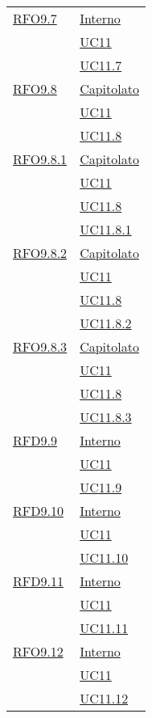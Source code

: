 \begin{longtable}{|>{\centering}m{5cm}|m{5cm}<{\centering}|}
    \hyperlink{RFO9.7}{RFO9.7} 
    & \hyperlink{Interno}{Interno}\\
  & \hyperref[UC11]{UC11}\\
  & \hyperref[UC11.7]{UC11.7}\\\hline

  \hyperlink{RFO9.8}{RFO9.8} 
  & \hyperlink{Capitolato}{Capitolato}\\
& \hyperref[UC11]{UC11}\\
& \hyperref[UC11.8]{UC11.8}\\\hline

\hyperlink{RFO9.8.1}{RFO9.8.1} 
  & \hyperlink{Capitolato}{Capitolato}\\
& \hyperref[UC11]{UC11}\\
& \hyperref[UC11.8]{UC11.8}\\
& \hyperref[UC11.8.1]{UC11.8.1}\\\hline

\hyperlink{RFO9.8.2}{RFO9.8.2} 
  & \hyperlink{Capitolato}{Capitolato}\\
& \hyperref[UC11]{UC11}\\
& \hyperref[UC11.8]{UC11.8}\\
& \hyperref[UC11.8.2]{UC11.8.2}\\\hline

\hyperlink{RFO9.8.3}{RFO9.8.3} 
  & \hyperlink{Capitolato}{Capitolato}\\
& \hyperref[UC11]{UC11}\\
& \hyperref[UC11.8]{UC11.8}\\
& \hyperref[UC11.8.3]{UC11.8.3}\\\hline

  \hyperlink{RFD9.9}{RFD9.9} 
  & \hyperlink{Interno}{Interno}\\
& \hyperref[UC11]{UC11}\\
& \hyperref[UC11.9]{UC11.9}\\\hline

 \hyperlink{RFD9.10}{RFD9.10} 
  & \hyperlink{Interno}{Interno}\\
& \hyperref[UC11]{UC11}\\
& \hyperref[UC11.10]{UC11.10}\\\hline

 \hyperlink{RFD9.11}{RFD9.11} 
  & \hyperlink{Interno}{Interno}\\
& \hyperref[UC11]{UC11}\\
& \hyperref[UC11.11]{UC11.11}\\\hline

  \hyperlink{RFO9.12}{RFO9.12} 
  & \hyperlink{Interno}{Interno}\\
& \hyperref[UC11]{UC11}\\
& \hyperref[UC11.12]{UC11.12}\\\hline


\end{longtable}
